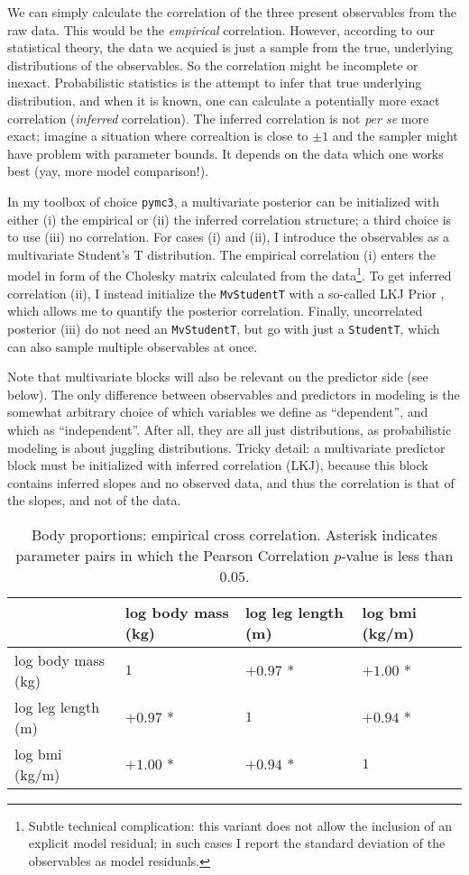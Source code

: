 We can simply calculate the correlation of the three present observables from the raw data.
This would be the \emph{empirical} correlation.
However, according to our statistical theory, the data we acquied is just a sample from the true, underlying distributions of the observables.
So the correlation might be incomplete or inexact.
Probabilistic statistics is the attempt to infer that true underlying distribution, and when it is known, one can calculate a potentially more exact correlation (\emph{inferred} correlation).
The inferred correlation is not \emph{per se} more exact; imagine a situation where correaltion is close to \(\pm 1\) and the sampler might have problem with parameter bounds.
It depends on the data which one works best (yay, more model comparison!).


In my toolbox of choice \texttt{pymc3}, a multivariate posterior can be initialized with either (i) the empirical or (ii) the inferred correlation structure; a third choice is to use (iii) no correlation.
For cases (i) and (ii), I introduce the observables as a multivariate Student's T distribution.
The empirical correlation (i) enters the model in form of the Cholesky matrix calculated from the data\footnote{Subtle technical complication: this variant does not allow the inclusion of an explicit model residual; in such cases I report the standard deviation of the observables as model residuals.}.
To get inferred correlation (ii), I instead initialize the \texttt{MvStudentT} with a so-called LKJ Prior \citep{LKJ2009}, which allows me to quantify the posterior correlation.
Finally, uncorrelated posterior (iii) do not need an \texttt{MvStudentT}, but go with just a \texttt{StudentT}, which can also sample multiple observables at once.

Note that multivariate blocks will also be relevant on the predictor side (see below).
The only difference between observables and predictors in modeling is the somewhat arbitrary choice of which variables we define as ``dependent'', and which as ``independent''.
After all, they are all just distributions, as probabilistic modeling is about juggling distributions.
Tricky detail: a multivariate predictor block must be initialized with inferred correlation (LKJ), because this block contains inferred slopes and no observed data, and thus the correlation is that of the slopes, and not of the data.


\begin{table}[p]
\caption{\label{tab:proportions_empiricalcorrelation}Body proportions: empirical cross correlation. Asterisk indicates parameter pairs in which the Pearson Correlation \(p\)-value is less than \(0.05\).}
\centering
\begin{tabular}{llll}
 & log body mass (kg) & log leg length (m) & log bmi (kg/m)\\[0pt]
\hline
log body mass (kg) & \(1\) & \(+0.97\) * & \(+1.00\) *\\[0pt]
log leg length (m) & \(+0.97\) * & \(1\) & \(+0.94\) *\\[0pt]
log bmi (kg/m) & \(+1.00\) * & \(+0.94\) * & \(1\)\\[0pt]
\end{tabular}
\end{table}

